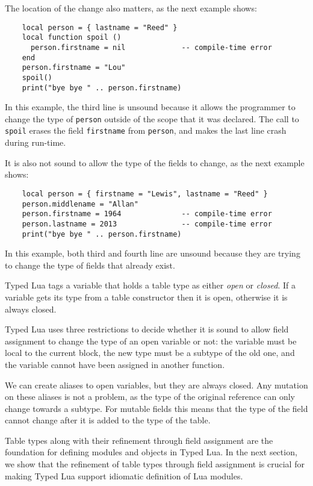 The location of the change also matters, as the next example shows:
\begin{verbatim}
    local person = { lastname = "Reed" }
    local function spoil ()
      person.firstname = nil             -- compile-time error
    end
    person.firstname = "Lou"
    spoil()
    print("bye bye " .. person.firstname)
\end{verbatim}

In this example, the third line is unsound because it allows the
programmer to change the type of \texttt{person} outside of the scope
that it was declared.
The call to \texttt{spoil} erases the field \texttt{firstname} from
\texttt{person}, and makes the last line crash during run-time.

It is also not sound to allow the type of the fields to change,
as the next example shows:
\begin{verbatim}
    local person = { firstname = "Lewis", lastname = "Reed" }
    person.middlename = "Allan"
    person.firstname = 1964              -- compile-time error
    person.lastname = 2013               -- compile-time error
    print("bye bye " .. person.firstname)
\end{verbatim}

In this example, both third and fourth line are unsound because
they are trying to change the type of fields that already exist.

Typed Lua tags a variable that holds a table type as either
\emph{open} or \emph{closed}.
If a variable gets its type from a table constructor then it
is open, otherwise it is always closed.

Typed Lua uses three restrictions to decide whether it is
sound to allow field assignment to change the type of an
open variable or not:
the variable must be local to the current block,
the new type must be a subtype of the old one, and
the variable cannot have been assigned in another function.

We can create aliases to open variables, but they are always closed.
Any mutation on these aliases is not a problem, as the type of
the original reference can only change towards a subtype.
For mutable fields this means that the type of the field cannot
change after it is added to the type of the table.

Table types along with their refinement through field assignment
are the foundation for defining modules and objects in Typed Lua.
In the next section, we show that the refinement of table types
through field assignment is crucial for making Typed Lua
support idiomatic definition of Lua modules.

